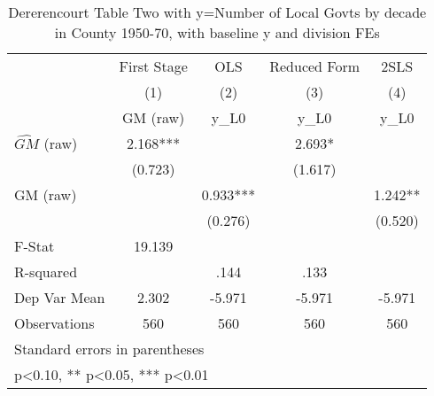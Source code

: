 \begin{table}[htbp]\centering
\def\sym#1{\ifmmode^{#1}\else\(^{#1}\)\fi}
\caption{Dererencourt Table Two with y=Number of Local Govts by decade in County 1950-70, with baseline y and division FEs}
\begin{tabular}{l*{4}{c}}
\toprule
                    & First Stage   &         OLS   &Reduced Form   &        2SLS   \\
                    &\multicolumn{1}{c}{(1)}&\multicolumn{1}{c}{(2)}&\multicolumn{1}{c}{(3)}&\multicolumn{1}{c}{(4)}\\
                    &\multicolumn{1}{c}{GM  (raw)}&\multicolumn{1}{c}{y\_L0}&\multicolumn{1}{c}{y\_L0}&\multicolumn{1}{c}{y\_L0}\\
\midrule
$\hat{GM}$ (raw)    &       2.168***&               &       2.693*  &               \\
                    &     (0.723)   &               &     (1.617)   &               \\
\addlinespace
GM  (raw)           &               &       0.933***&               &       1.242** \\
                    &               &     (0.276)   &               &     (0.520)   \\
\midrule
F-Stat              &      19.139   &               &               &               \\
R-squared           &               &        .144   &        .133   &               \\
Dep Var Mean        &       2.302   &      -5.971   &      -5.971   &      -5.971   \\
Observations        &         560   &         560   &         560   &         560   \\
\bottomrule
\multicolumn{5}{l}{\footnotesize Standard errors in parentheses}\\
\multicolumn{5}{l}{\footnotesize * p<0.10, ** p<0.05, *** p<0.01}\\
\end{tabular}
\end{table}
